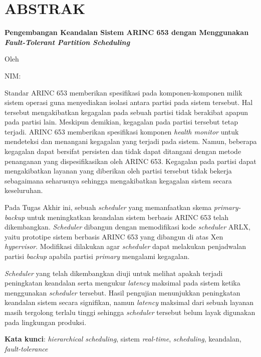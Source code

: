 \clearpage
\chapter*{ABSTRAK}

\begin{center}

	\large \bfseries
	Pengembangan Keandalan Sistem ARINC 653 dengan Menggunakan \textit{Fault-Tolerant Partition Scheduling}

	\normalsize \normalfont Oleh

	\large \penulis

	\large NIM: \nimpenulis

\end{center}

Standar ARINC 653 memberikan spesifikasi pada komponen-komponen milik sistem operasi guna
menyediakan isolasi antara partisi pada sistem tersebut. Hal tersebut mengakibatkan kegagalan
pada sebuah partisi tidak berakibat apapun pada partisi lain. Meskipun demikian, kegagalan pada
partisi tersebut tetap terjadi. ARINC 653 memberikan spesifikasi komponen \textit{health
monitor} untuk mendeteksi dan menangani kegagalan yang terjadi pada sistem. Namun, beberapa
kegagalan dapat bersifat persisten dan tidak dapat ditangani dengan metode penanganan yang
dispesifikasikan oleh ARINC 653.  Kegagalan pada partisi dapat mengakibatkan layanan yang
diberikan oleh partisi tersebut tidak bekerja sebagaimana seharusnya sehingga mengakibatkan
kegagalan sistem secara keseluruhan.

Pada Tugas Akhir ini, sebuah \textit{scheduler} yang memanfaatkan skema \textit{primary-backup}
untuk meningkatkan keandalan sistem berbasis ARINC 653 telah dikembangkan.  \textit{Scheduler}
dibangun dengan memodifikasi kode \textit{scheduler} ARLX, yaitu prototipe sistem berbasis ARINC
653 yang dibangun di atas Xen \textit{hypervisor}. Modifikasi dilakukan agar \textit{scheduler}
dapat melakukan penjadwalan partisi \textit{backup} apabila partisi \textit{primary} mengalami
kegagalan.

\textit{Scheduler} yang telah dikembangkan diuji untuk melihat apakah terjadi peningkatan
keandalan serta mengukur \textit{latency} maksimal pada sistem ketika menggunakan
\textit{scheduler} tersebut. Hasil pengujian menunjukkan peningkatan keandalan sistem secara
signifikan, namun \textit{latency} maksimal dari sebuah layanan masih tergolong terlalu tinggi
sehingga \textit{scheduler} tersebut belum layak digunakan pada lingkungan produksi.

\textbf{Kata kunci}: \textit{hierarchical scheduling}, sistem \textit{real-time},
\textit{scheduling}, keandalan, \textit{fault-tolerance}

\clearpage

